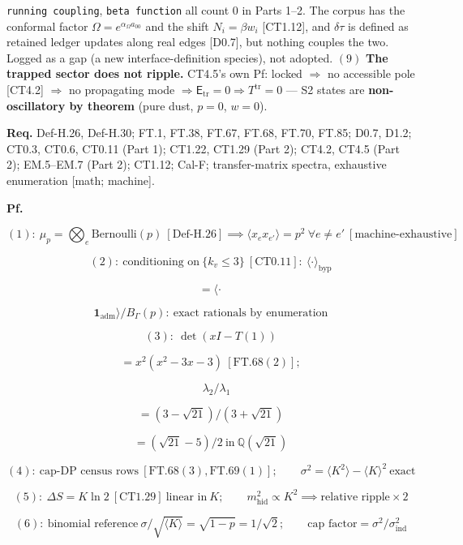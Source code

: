 \begin{theorem}
\texttt{running\ coupling}, \texttt{beta\ function} all count $0$ in Parts 1–2. The corpus has the conformal factor $\Omega=e^{\alpha_\Omega a_{00}}$ and the shift $N_i=\beta w_i$ [CT1.12], and $\delta\tau$ is defined as retained ledger updates along real edges [D0.7], but nothing couples the two. Logged as a gap (a new interface-definition species), not adopted. $(9)$ \textbf{The trapped sector does not ripple.} CT4.5's own Pf: locked $\Rightarrow$ no accessible pole [CT4.2] $\Rightarrow$ no propagating mode $\Rightarrow\mathsf E_{\mathrm{tr}}=0\Rightarrow T^{\mathrm{tr}}=0$ — S2 states are \textbf{non-oscillatory by theorem} (pure dust, $p=0$, $w=0$).

\textbf{Req.} Def-H.26, Def-H.30; FT.1, FT.38, FT.67, FT.68, FT.70, FT.85; D0.7, D1.2; CT0.3, CT0.6, CT0.11 (Part 1); CT1.22, CT1.29 (Part 2); CT4.2, CT4.5 (Part 2); EM.5–EM.7 (Part 2); CT1.12; Cal-F; transfer-matrix spectra, exhaustive enumeration [math; machine].

\textbf{Pf.}

\[
(1):\ \mu_p=\bigotimes_e\mathrm{Bernoulli}(p)\ [\mathrm{Def\text{-}H.26}]\implies\langle x_ex_{e'}\rangle=p^2\ \forall e\ne e'\ [\text{machine-exhaustive}]
\]

\[
(2):\ \text{conditioning on}\ \{k_v\le3\}\ [\mathrm{CT0.11}]:\ \langle\cdot\rangle_{\mathrm{byp}}
\]

\[
= \langle\cdot\,
\]

\[
\mathbf1_{\mathrm{adm}}\rangle/B_\Gamma(p):\ \text{exact rationals by enumeration}
\]

\[
(3):\ \det(xI-T(1))
\]

\[
= x^2(x^2-3x-3)\ [\mathrm{FT.68}(2)];
\]

\[
\quad\lambda_2/\lambda_1
\]

\[
= (3-\sqrt{21})/(3+\sqrt{21})
\]

\[
= (\sqrt{21}-5)/2\ \text{in}\ \mathbb Q(\sqrt{21})
\]

\[
(4):\ \text{cap-DP census rows}\ [\mathrm{FT.68}(3),\mathrm{FT.69}(1)];\qquad\sigma^2=\langle K^2\rangle-\langle K\rangle^2\ \text{exact}
\]

\[
(5):\ \Delta S=K\ln2\ [\mathrm{CT1.29}]\ \text{linear in}\ K;\qquad m_{\mathrm{hid}}^2\propto K^2\implies\text{relative ripple}\times2
\]

\[
(6):\ \text{binomial reference}\ \sigma/\sqrt{\langle K\rangle}=\sqrt{1-p}=1/\sqrt2;\qquad\text{cap factor}=\sigma^2/\sigma^2_{\mathrm{ind}}
\]


\end{theorem}
